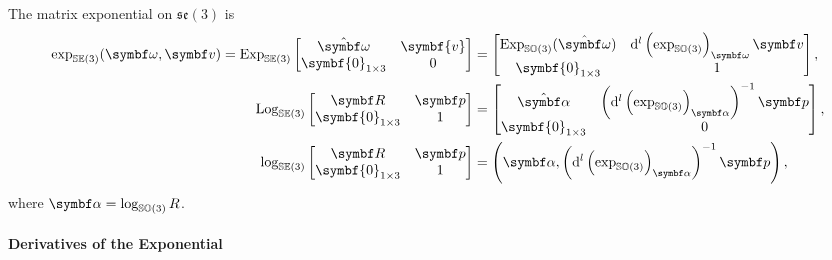 \begin{important}
  The matrix exponential on $\mathfrak{se}(3)$ is
  \begin{subequations}
    \begin{align}
      \exp_\SEthree (\bomega, \bv) = \Exp_\SEthree \begin{bmatrix}
        \hat{\bomega} & \symbf{v} \\ \symbf{0}_{1 \times 3} & 0
      \end{bmatrix} & = \begin{bmatrix}
        \Exp_{\SOthree}(\hat{\bomega}) & \mathrm{d}^l \left( \exp_{\SOthree} \right)_\bomega \symbf v \\ \symbf{0}_{1 \times 3} & 1
      \end{bmatrix},                                                                                        \\
      \Log_\SEthree \begin{bmatrix}
        \bR & \bp \\ \symbf{0}_{1 \times 3} & 1
      \end{bmatrix}                                & = \begin{bmatrix}
        \hat{\symbf \alpha} & \left( \mathrm{d}^l \left( \exp_{\SOthree} \right)_{\symbf \alpha} \right)^{-1} \bp \\ \symbf{0}_{1 \times 3} & 0
      \end{bmatrix},                                                                                        \\
      \log_\SEthree \begin{bmatrix}
        \bR & \bp \\ \symbf{0}_{1 \times 3} & 1
      \end{bmatrix}                                & = \left(\symbf \alpha, \left( \mathrm{d}^l \left( \exp_{\SOthree} \right)_{\symbf \alpha} \right)^{-1} \bp  \right),
    \end{align}
  \end{subequations}
  where $\symbf \alpha = \log_\SOthree R$.
\end{important}

\paragraph{Derivatives of the Exponential}

